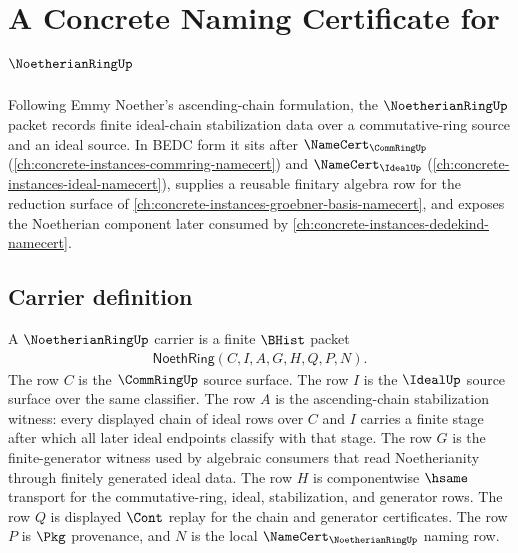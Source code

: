 \chapter{A Concrete Naming Certificate for $\NoetherianRingUp$}
\label{ch:concrete-instances-noetherian-ring-namecert}

Following Emmy Noether's ascending-chain formulation, the $\NoetherianRingUp$ packet records finite ideal-chain stabilization data over a commutative-ring source and an ideal source. In BEDC form it sits after $\NameCert_{\CommRingUp}$ (\autoref{ch:concrete-instances-commring-namecert}) and $\NameCert_{\IdealUp}$ (\autoref{ch:concrete-instances-ideal-namecert}), supplies a reusable finitary algebra row for the reduction surface of \autoref{ch:concrete-instances-groebner-basis-namecert}, and exposes the Noetherian component later consumed by \autoref{ch:concrete-instances-dedekind-namecert}.

\section{Carrier definition}
\label{sec:noetherian-ring-carrier}

\begin{definition}\label{def:noetherian-ring-carrier}
A $\NoetherianRingUp$ carrier is a finite $\BHist$ packet
$$
\begin{gathered}
\mathsf{NoethRing}(C,I,A,G,H,Q,P,N).
\end{gathered}
$$
The row $C$ is the $\CommRingUp$ source surface. The row $I$ is the $\IdealUp$ source surface over the same classifier. The row $A$ is the ascending-chain stabilization witness: every displayed chain of ideal rows over $C$ and $I$ carries a finite stage after which all later ideal endpoints classify with that stage. The row $G$ is the finite-generator witness used by algebraic consumers that read Noetherianity through finitely generated ideal data. The row $H$ is componentwise $\hsame$ transport for the commutative-ring, ideal, stabilization, and generator rows. The row $Q$ is displayed $\Cont$ replay for the chain and generator certificates. The row $P$ is $\Pkg$ provenance, and $N$ is the local $\NameCert_{\NoetherianRingUp}$ naming row.
\end{definition}

